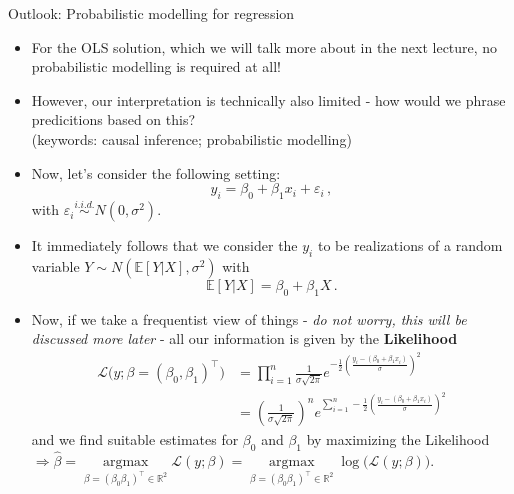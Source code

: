 \documentclass[a4,11pt]{beamer}
\newcommand{\R}{\mathbb{R}}
\newlength{\wideitemsep}
\let\olditem\item
\renewcommand{\item}{\setlength{\itemsep}{\wideitemsep}\olditem}
\begin{document}
\begin{frame}[allowframebreaks]{Outlook: Probabilistic modelling for regression}
\begin{itemize}
	\item For the OLS solution, which we will talk more about in the next lecture, no probabilistic modelling is required at all!
	\item However, our interpretation is technically also limited - how would we phrase predicitions based on this? \\{\small(\textcolor{blueberry}{keywords: causal inference; probabilistic modelling})}
	\item Now, let's consider the following setting:  \begin{equation*}
		y_i=\beta_0+\beta_1x_i+\varepsilon_i\,,
	\end{equation*} with $\varepsilon_i\overset{i.i.d.}{\sim}N(0,\sigma^2)$.
\item It immediately follows that we consider the $y_i$ to be realizations of a random variable $Y\sim N(\mathbb{E}[Y\vert X],\sigma^2)$ with \begin{equation*}
	\mathbb{E}[Y\vert X]=\beta_0+\beta_1X\,.
\end{equation*}
\item Now, if we take a frequentist view of things - \textcolor{blueberry}{\emph{do not worry, this will be discussed more later}} - all our information is given by the \textcolor{blueberry}{\textbf{Likelihood}}\begin{align*}
	\mathcal{L}\Big(y;\beta=(\beta_0,\beta_1)^\top\Big)&=\prod_{i=1}^n {\frac {1}{\sigma {\sqrt {2\pi }}}}e^{-{\frac {1}{2}}\left({\frac {y_i-(\beta_0+\beta_1x_i) }{\sigma}}\right)^2}\\
	&=\left(\frac{1}{\sigma {\sqrt {2\pi }}}\right)^n e^{\sum_{i=1}^n -{\frac {1}{2}}\left({\frac {y_i-(\beta_0+\beta_1x_i) }{\sigma}}\right)^2}
\end{align*}
and we find suitable estimates for $\beta_0$ and $\beta_1$ by maximizing the Likelihood $\Rightarrow \hat{\beta}=\underset{\beta=(\beta_0\beta_1)^\top\in\R^2}{\operatorname{arg max}}\mathcal{L}(y;\beta)=\underset{\beta=(\beta_0\beta_1)^\top\in\R^2}{\operatorname{arg max}}\log\big(\mathcal{L}(y;\beta)\big)$.


\end{itemize}
\end{frame}
\end{document}
